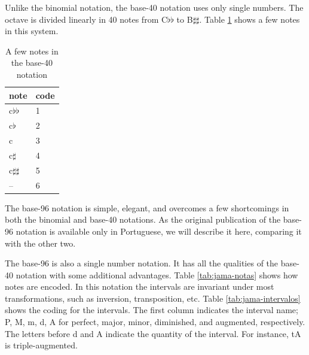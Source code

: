 \documentclass{article}
\begin{document}
Unlike the binomial notation, the base-40 notation uses only single
numbers. The octave is divided linearly in 40 notes from C$\flat\flat$
to B$\sharp\sharp$. Table \ref{tab:base40} shows a few notes in this
system.

\begin{table}
  \centering
  \begin{tabular}{l|l}
    note & code \\
    \hline
    c$\flat\flat$ & 1 \\
    c$\flat$ & 2 \\
    c & 3 \\
    c$\sharp$ & 4 \\
    c$\sharp\sharp$ & 5 \\
    -- & 6 \\
  \end{tabular}
  \caption{A few notes in the base-40 notation}
  \label{tab:base40}
\end{table}

The base-96 notation is simple, elegant, and overcomes a few
shortcomings in both the binomial and base-40 notations. As the
original publication of the base-96 notation is available only in
Portuguese, we will describe it here, comparing it with the other
two. 

The base-96 is also a single number notation. It has all the qualities
of the base-40 notation with some additional advantages. Table
\ref{tab:jama-notas} shows how notes are encoded. In this notation the
intervals are invariant under most transformations, such as inversion,
transposition, etc. Table \ref{tab:jama-intervalos} shows the coding
for the intervals. The first column indicates the interval name; P, M,
m, d, A for perfect, major, minor, diminished, and augmented,
respectively. The letters before d and A indicate the quantity of the
interval. For instance, tA is triple-augmented.
\end{document}
